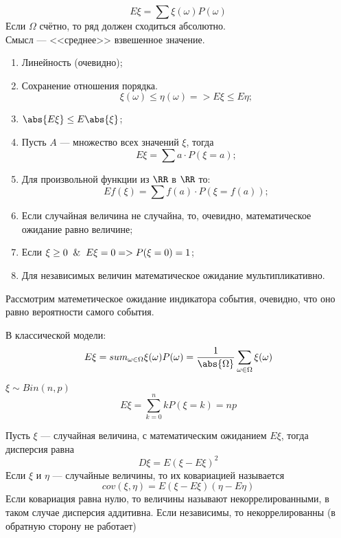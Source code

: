 \begin{definition}
    \[E\xi = \sum\xi(\omega)P(\omega)\]
    Если $\Omega$ счётно, то ряд должен сходиться абсолютно.\\ 
    Смысл --- <<среднее>> взвешенное значение.
    \begin{theorem}
        \phantom{asdf}
        \begin{enumerate}
            \item Линейность (очевидно);
            \item Сохранение отношения порядка. \[\xi(\omega) \leq \eta(\omega) => E\xi \leq E\eta;\]
            \item $\abs{E\xi} \leq E\abs{\xi}$;
            \item Пусть $A$ --- множество всех значений $\xi$, тогда \[E\xi = \sum a \cdot P(\xi=a);\]
            \item Для произвольной функции из $\RR$ в $\RR$ то: \[Ef(\xi) = \sum f(a) \cdot P(\xi=f(a));\]
            \item Если случайная величина не случайна, то, очевидно, математическое ожидание равно величине;
            \item Если $\xi \geq 0 \And E\xi = 0 => P(\xi=0)=1$;
            \item Для независимых величин математическое ожидание мультипликативно.
        \end{enumerate}
    \end{theorem}
\end{definition}

\vspace*{10pt}
Рассмотрим матеметическое ожидание индикатора события, очевидно, что оно равно вероятности самого события.

В классической модели:
    \[E\xi = sum_{\omega \in \Omega} \xi(\omega)P(\omega) = \frac{1}{\abs{\Omega}}\sum_{\omega \in \Omega}\xi(\omega)\]

$\xi \sim Bin(n, p)$
    \[E\xi = \sum_{k=0}^n kP(\xi=k) = np\]


\begin{definition}
    Пусть $\xi$ --- случайная величина, с математическим ожиданием $E\xi$, тогда дисперсия равна 
        \[D\xi = E(\xi - E\xi)^2\]
    Если $\xi$ и $\eta$ --- случайные величины, то их ковариацией называется 
        \[cov(\xi, \eta) = E(\xi-E\xi)(\eta-E\eta)\]
    Если ковариация равна нулю, то величины называют некоррелированными, в таком случае дисперсия аддитивна. Если независимы, 
    то некоррелированны (в обратную сторону не работает)
\end{definition}

